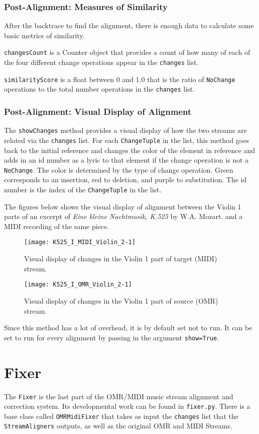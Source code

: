 \subsubsection{Post-Alignment: Measures of Similarity}
After the backtrace to find the alignment, there is enough data to calculate some basic metrics of similarity. 

\texttt{changesCount} is a Counter object that provides a count of how many of each of the four different change operations appear in the \texttt{changes} list. 

\texttt{similarityScore} is a float between 0 and 1.0 that is the ratio of \texttt{NoChange} operations to the total number operations in the \texttt{changes} list.
\subsubsection{Post-Alignment: Visual Display of Alignment}
The \texttt{showChanges} method provides a visual display of how the two streams are related via the \texttt{changes} list. For each \texttt{ChangeTuple} in the list, this method goes back to the initial reference and changes the color of the element in reference and adds in an id number as a lyric to that element if the change operation is not a \texttt{NoChange}. The color is determined by the type of change operation. Green corresponds to an insertion, red to deletion, and purple to substitution. The id number is the index of the \texttt{ChangeTuple} in the list. 

The figures below shows the visual display of alignment between the Violin 1 parts of an excerpt of \textit{Eine kleine Nachtmusik, K.525} by W.A. Mozart. and a MIDI recording of the same piece.
\begin{figure}[H]
\centering
\texttt{[image: K525\_I\_MIDI\_Violin\_2-1]}
\caption{Visual display of changes in the Violin 1 part of target (MIDI) stream.}
\end{figure}

\begin{figure}[H]
\centering
\texttt{[image: K525\_I\_OMR\_Violin\_2-1]}
\caption{Visual display of changes in the Violin 1 part of source (OMR) stream.}
\end{figure}

Since this method has a lot of overhead, it is by default set not to run. It can be set to run for every alignment by passing in the argument \texttt{show=True}. 

\section{Fixer} \label{fixer}
The \texttt{Fixer} is the last part of the OMR/MIDI music stream alignment and correction system. Its developmental work can be found in \texttt{fixer.py}. There is a base class called \texttt{OMRMidiFixer} that takes as input the \texttt{changes} list that the \texttt{StreamAligners} outputs, as well as the original OMR and MIDI Streams.

